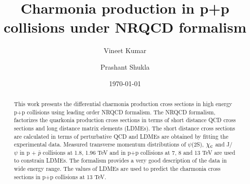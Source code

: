 \documentclass[aps,prc,preprint,superscriptaddress,showpacs,showkeys,amsmath]{revtex4-1}
\begin{document}
\newcommand{\Jpsi}{J/\psi}
\newcommand{\pT}{p_{T}}
\newcommand{\calO}{{\cal{O}}}
\newcommand{\barQ}{{\bar{Q}}}
\newcommand{\barq}{{\bar{q}}}
\newcommand{\barc}{{\bar{c}}}
\newcommand{\barb}{{\bar{b}}}
\newcommand{\baru}{\bar{u}}
\newcommand{\barv}{\bar{v}}
\newcommand{\barup}{\bar{u}_{+}}
\newcommand{\barum}{\bar{u}_{-}}
\newcommand{\barvp}{\bar{v}_{+}}
\newcommand{\barvm}{\bar{v}_{-}}
\newcommand{\charm}{{\rm{charm}}}
\newcommand{\bottom}{{\rm{bottom}}}

\newcommand{\cs}{{\hat{s}}}
\newcommand{\ct}{{\hat{t}}}
\newcommand{\cu}{{\hat{u}}}
\newcommand{\alphas}{{\alpha_{s}}}


\newcommand{\shat}{\hat{\rm s}}
\newcommand{\that}{\hat{\rm t}}
\newcommand{\uhat}{\hat{\rm u}}
\newcommand{\zhat}{\hat{\rm z}}

\newcommand{\CA}{{\cal A}}
\newcommand{\Qbar}{{\overline Q}}
\newcommand{\QQbaroctetgen}{{Q\Qbar[ ^{2S+1}L_J^{(8)}]}}
\newcommand{\QQbaroctetsingS}{{Q\Qbar[ ^1S_0^{(8)}]}}
\newcommand{\QQbaroctettripP}{{Q\Qbar[ ^3P_J^{(8)}]}}
\newcommand{\QQbaroctettripPone}{{Q\Qbar[ ^3P_1^{(8)}]}}

\def\QQbaroctettripS{Q\Qbar[ ^3S_1^{(8)}]}
\def\QQbaroctetPzero{Q\Qbar[ ^3P_0^{(8)}]}
\def\QQbaroctetPone{Q\Qbar[ ^3P_1^{(8)}]}
\def\QQbaroctetPtwo{Q\Qbar[ ^3P_2^{(8)}]}



\title{{\Large Charmonia production in p+p collisions under NRQCD formalism}} 
\author{\large Vineet Kumar}
\author{\large Prashant Shukla}
\date{\today}

\begin{abstract}

  This work presents the differential charmonia production cross sections in high 
energy p+p collisions using leading order NRQCD formalism. The NRQCD formalism, 
factorizes the quarkonia production cross sections in terms of short distance QCD 
cross sections and long distance matrix elements (LDMEs). The short distance cross
sections are calculated in terms of perturbative QCD and LDMEs are obtained by 
fitting the experimental data. Measured transverse momentum distributions of 
$\psi$(2S), $\chi_{\rm c}$ and J/$\psi$ in p + {$\bar p$} collisions at 1.8, 1.96 TeV 
and in p+p collisions at 7, 8 and 13 TeV are used to constrain LDMEs. 
  The formalism provides a very good description of the data in wide energy range. 
The values of LDMEs are used to predict the charmonia cross sections in p+p collisions 
at 13 TeV.

\end{abstract}
\end{document}
